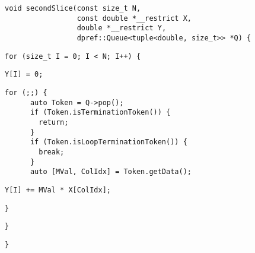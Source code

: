 \begin{lstlisting}[style=cppcode]
void secondSlice(const size_t N,
                 const double *__restrict X,
                 double *__restrict Y,
                 dpref::Queue<tuple<double, size_t>> *Q) {
\end{lstlisting}\vspace{-\baselineskip}

\begin{lstlisting}[style=cppcode, backgroundcolor=\color{yellow!15}, firstnumber=last]
  for (size_t I = 0; I < N; I++) {
\end{lstlisting}\vspace{-\baselineskip}

\begin{lstlisting}[style=cppcode, backgroundcolor=\color{red!15}, firstnumber=last]
    Y[I] = 0;
\end{lstlisting}\vspace{-\baselineskip}

\begin{lstlisting}[style=cppcode, firstnumber=last]
    for (;;) {
      auto Token = Q->pop();
      if (Token.isTerminationToken()) {
        return;
      }
      if (Token.isLoopTerminationToken()) {
        break;
      }
      auto [MVal, ColIdx] = Token.getData();
\end{lstlisting}\vspace{-\baselineskip}

\begin{lstlisting}[style=cppcode, backgroundcolor=\color{red!15}, firstnumber=last]
      Y[I] += MVal * X[ColIdx];
\end{lstlisting}\vspace{-\baselineskip}

\begin{lstlisting}[style=cppcode, firstnumber=last]
    }
\end{lstlisting}\vspace{-\baselineskip}

\begin{lstlisting}[style=cppcode, backgroundcolor=\color{yellow!15}, firstnumber=last]
  }
\end{lstlisting}\vspace{-\baselineskip}

\begin{lstlisting}[style=cppcode, firstnumber=last]
}
\end{lstlisting}\vspace{-\baselineskip}
